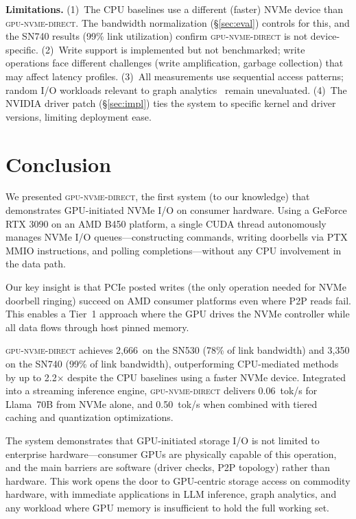 \documentclass{article}
\newcommand{\sysname}{\textsc{gpu-nvme-direct}}
\newcommand{\MBs}{\,\text{MB/s}}
\begin{document}
\textbf{Limitations.} (1)~The CPU baselines use a different (faster) NVMe
device than \sysname{}. The bandwidth normalization (\S\ref{sec:eval})
controls for this, and the SN740 results (99\% link utilization) confirm
\sysname{} is not device-specific. (2)~Write support is implemented but not
benchmarked; write operations face different challenges (write amplification,
garbage collection) that may affect latency profiles. (3)~All measurements
use sequential access patterns; random I/O workloads relevant to graph
analytics~\cite{qureshi2023bam,park2024gids} remain unevaluated. (4)~The
NVIDIA driver patch (\S\ref{sec:impl}) ties the system to specific
kernel and driver versions, limiting deployment ease.

\section{Conclusion}
\label{sec:conclusion}

We presented \sysname{}, the first system (to our knowledge) that demonstrates
GPU-initiated NVMe I/O on consumer hardware. Using a GeForce RTX 3090 on an
AMD B450 platform, a single CUDA thread autonomously manages NVMe I/O
queues---constructing commands, writing doorbells via PTX MMIO instructions, and
polling completions---without any CPU involvement in the data path.

Our key insight is that PCIe posted writes (the only operation needed for NVMe
doorbell ringing) succeed on AMD consumer platforms even where P2P reads fail.
This enables a Tier~1 approach where the GPU drives the NVMe controller while
all data flows through host pinned memory.

\sysname{} achieves 2{,}666\MBs{} on the SN530 (78\% of link bandwidth) and
3{,}350\MBs{} on the SN740 (99\% of link bandwidth), outperforming
CPU-mediated methods by up to 2.2$\times$ despite the CPU baselines using a
faster NVMe device. Integrated into a streaming inference engine, \sysname{}
delivers 0.06~tok/s for Llama~70B from NVMe alone, and 0.50~tok/s when
combined with tiered caching and quantization optimizations.

The system demonstrates that GPU-initiated storage I/O is not limited to
enterprise hardware---consumer GPUs are physically capable of this operation,
and the main barriers are software (driver checks, P2P topology) rather than
hardware. This work opens the door to GPU-centric storage access on commodity
hardware, with immediate applications in LLM inference, graph analytics, and
any workload where GPU memory is insufficient to hold the full working set.
\end{document}
